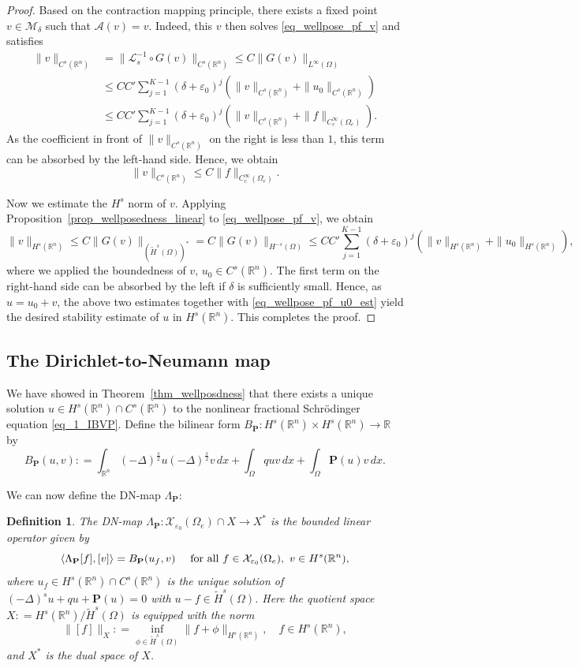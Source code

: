 \documentclass [oneside,11pt] {amsart}
\numberwithin{equation}{section}
\newtheorem{defn}{Definition}[section]
\newcommand{\R}{\mathbb{R}}
\newcommand{\dx}{\,dx}
\newcommand{\LC}{\left(}
\newcommand{\RC}{\right)}
\newcommand{\LA}{\langle}
\newcommand{\RA}{\rangle}
\begin{document}
\begin{proof}
Based on the contraction mapping principle, there exists a fixed point $v\in \mathcal{M}_\delta$ such that $\mathcal{A}(v)=v$. Indeed, this $v$ then solves \eqref{eq_wellpose_pf_v} and satisfies
\begin{align*}
\|v\|_{C^{s}(\R^n)}&= \|\mathcal{L}_s^{-1}\circ G(v)\|_{C^{s}(\R^n)}\leq C\|G(v)\|_{L^\infty(\Omega)}\\
&\leq CC' \sum^{K-1}_{j=1}(\delta+\varepsilon_0)^{j}  \LC \|v\|_{C^{s}(\R^n)} +\|u_0\|_{C^{s}(\R^n)}\RC\\
&\leq C C'\sum^{K-1}_{j=1}(\delta+\varepsilon_0)^{j} \LC \|v\|_{C^{s}(\R^n)} +\|f\|_{C^\infty_c(\Omega_e)}\RC.
\end{align*} 
As the coefficient in front of $\|v\|_{C^{s}(\R^n)}$ on the right is less than $1$, this term can be absorbed by the left-hand side. Hence, we obtain
$$
\|v\|_{C^{s}(\R^n)}\leq C\|f\|_{C^\infty_c(\Omega_e)}.
$$

Now we estimate the $H^s$ norm of $v$. Applying Proposition~\ref{prop_wellposedness_linear} to \eqref{eq_wellpose_pf_v}, we obtain 
\[
\|v\|_{H^s(\R^n)}\le C\|G(v)\|_{(\widetilde{H}^s(\Omega))^*} = C\|G(v)\|_{H^{-s}(\Omega)}\le CC' \sum^{K-1}_{j=1}(\delta+\varepsilon_0)^{j}\LC \|v\|_{H^s(\R^n)} +\|u_0\|_{H^s(\R^n)} \RC,
\]
where we applied the boundedness of $v,\,u_0\in C^{s}(\R^n)$. The first term on the right-hand side can be absorbed by the left if $\delta$ is sufficiently small. Hence, as $u=u_0+v$, the above two estimates together with \eqref{eq_wellpose_pf_u0_est} yield the desired stability estimate of $u$ in $H^s(\R^n)$.
This completes the proof.
\end{proof}

\subsection{The Dirichlet-to-Neumann map}
We have showed in Theorem~\ref{thm_wellposdness} that there exists a unique solution $u\in H^s(\R^n)\cap C^s(\R^n)$ to the nonlinear fractional Schr\"odinger equation \eqref{eq_1_IBVP}. Define the bilinear form $B_{\mathbf{P}}: H^s(\R^n)\times H^s(\R^n)\to \R$ by
\[
B_{\mathbf{P}}(u,v) : = \int_{\R^n}(-\Delta)^{\frac{s}{2}}u(-\Delta)^{\frac{s}{2}}v \dx + \int_\Omega quv\,dx+ \int_\Omega \mathbf{P}(u)v\dx.
\]

We can now define the DN-map $\Lambda_{\mathbf{P}}$: 
\begin{defn}
The DN-map $\Lambda_{\mathbf P}:\mathcal{X}_{\varepsilon_0}(\Omega_e)\cap X \to X^*$ is the bounded linear operator given by 
\begin{equation}\label{eq_def_DN}
\LA \Lambda_\mathbf{P}[f],[v] \RA = B_\mathbf{P}(u_f,v)  \quad \hbox{ for all } f\in \mathcal{X}_{\varepsilon_0}(\Omega_e),\,\, v\in H^s(\R^n),
\end{equation}
where $u_f\in H^s(\R^n)\cap C^{s}(\R^n)$ is the unique solution of 
$(-\Delta)^su + qu+\mathbf{P}(u) = 0$ 
with $u-f\in \widetilde{H}^s(\Omega)$.
Here the quotient space $X : = H^{s}(\R^n)/\widetilde{H}^s(\Omega)$ is equipped with the norm 
\[
\|[f]\|_X: = \inf_{\phi\in \widetilde{H}^s(\Omega)} \|f+\phi\|_{H^s(\R^n)},\quad f\in H^s(\R^n),
\]
and $X^*$ is the dual space of $X$.
\end{defn}
\end{document}
